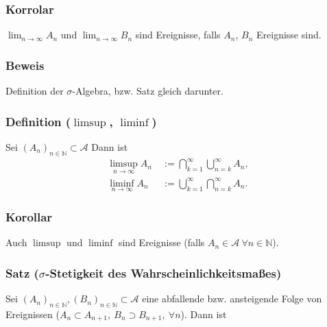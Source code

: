 \subsubsection{Korrolar}
$\lim_{n\to\infty}A_n$ und $\lim_{n\to\infty}B_n$ sind Ereignisse, falls $A_n$, $B_n$ Ereignisse sind.
\subsubsection{Beweis}
Definition der $\sigma$-Algebra, bzw. Satz gleich darunter.
\subsubsection{Definition ($\limsup$, $\liminf$)}
Sei $(A_n)_{n\in\mathbb{N}}\subset\mathcal{A}$ Dann ist
\begin{align*}
\limsup_{n\to\infty}A_n&\ :=\bigcap_{k=1}^\infty\bigcup_{n=k}^\infty A_n,\\
\liminf_{n\to\infty}A_n&\ :=\bigcup_{k=1}^\infty\bigcap_{n=k}^\infty A_n.
\end{align*}
\subsubsection{Korollar}
Auch $\limsup$ und $\liminf$ sind Ereignisse (falls $A_n\in\mathcal{A}\ \forall n\in\mathbb{N}$).
\subsubsection{Satz ($\sigma$-Stetigkeit des Wahrscheinlichkeitsma\ss{}es)}
Sei $(A_n)_{n\in\mathbb{N}},(B_n)_{n\in\mathbb{N}}\subset\mathcal{A}$ eine abfallende bzw. ansteigende Folge von Ereignissen ($A_n\subset A_{n+1},\ B_n\supset B_{n+1},\ \forall n$). Dann ist
